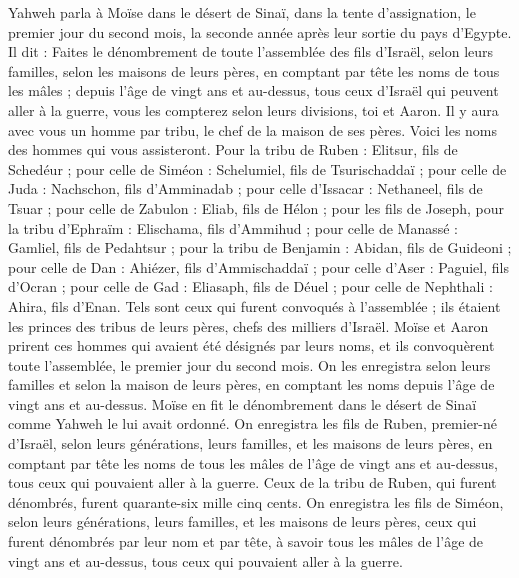 \begin{multicols}{2}
\VerseOne{}Yahweh parla à Moïse dans le désert de Sinaï, dans la tente d'assignation, le premier jour du second mois, la seconde année après leur sortie du pays d'Egypte. Il dit :
Faites le dénombrement de toute l'assemblée des fils d'Israël, selon leurs familles, selon les maisons de leurs pères, en comptant par tête les noms de tous les mâles ;
depuis l'âge de vingt ans et au-dessus, tous ceux d'Israël qui peuvent aller à la guerre, vous les compterez selon leurs divisions, toi et Aaron.
Il y aura avec vous un homme par tribu, le chef de la maison de ses pères.
Voici les noms des hommes qui vous assisteront. Pour la tribu de Ruben : Elitsur, fils de Schedéur ;
pour celle de Siméon : Schelumiel, fils de Tsurischaddaï ;
pour celle de Juda : Nachschon, fils d’Amminadab ;
pour celle d'Issacar : Nethaneel, fils de Tsuar ;
pour celle de Zabulon : Eliab, fils de Hélon ;
pour les fils de Joseph, pour la tribu d'Ephraïm : Elischama, fils d’Ammihud ; pour celle de Manassé : Gamliel, fils de Pedahtsur ;
pour la tribu de Benjamin : Abidan, fils de Guideoni ;
pour celle de Dan : Ahiézer, fils d’Ammischaddaï ;
pour celle d'Aser : Paguiel, fils d’Ocran ;
pour celle de Gad : Eliasaph, fils de Déuel ;
pour celle de Nephthali : Ahira, fils d’Enan.
Tels sont ceux qui furent convoqués à l'assemblée ; ils étaient les princes des tribus de leurs pères, chefs des milliers d'Israël.
Moïse et Aaron prirent ces hommes qui avaient été désignés par leurs noms,
et ils convoquèrent toute l'assemblée, le premier jour du second mois. On les enregistra selon leurs familles et selon la maison de leurs pères, en comptant les noms depuis l'âge de vingt ans et au-dessus.
Moïse en fit le dénombrement dans le désert de Sinaï comme Yahweh le lui avait ordonné.
On enregistra les fils de Ruben, premier-né d'Israël, selon leurs générations, leurs familles, et les maisons de leurs pères, en comptant par tête les noms de tous les mâles de l'âge de vingt ans et au-dessus, tous ceux qui pouvaient aller à la guerre.
Ceux de la tribu de Ruben, qui furent dénombrés, furent quarante-six mille cinq cents.
On enregistra les fils de Siméon, selon leurs générations, leurs familles, et les maisons de leurs pères, ceux qui furent dénombrés par leur nom et par tête, à savoir tous les mâles de l'âge de vingt ans et au-dessus, tous ceux qui pouvaient aller à la guerre.

\end{multicols}
